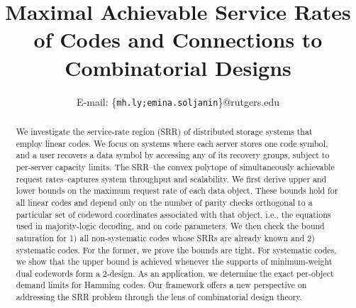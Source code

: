 \documentclass[conference,letterpaper]{IEEEtran}
\begin{document}
\title{Maximal Achievable Service Rates of Codes and Connections to Combinatorial Designs}


\author{%
                    E-mail: \{\texttt{mh.ly;emina.soljanin}\}@rutgers.edu
}
\maketitle
\begin{abstract}
We investigate the service-rate region (SRR) of distributed storage systems that employ linear codes. We focus on systems where each server stores one code symbol, and a user recovers a data symbol by accessing any of its recovery groups, subject to per-server capacity limits. The SRR--the convex polytope of simultaneously achievable request rates--captures system throughput and scalability. We first derive upper and lower bounds on the maximum request rate of each data object. These bounds hold for all linear codes and depend only on the number of parity checks orthogonal to a particular set of codeword coordinates associated with that object, i.e., the equations used in majority-logic decoding, and on code parameters. 
We then check the bound saturation for 1) all non-systematic codes whose SRRs are already known and 2) systematic codes. For the former, we prove the bounds are tight. For systematic codes, we show that the upper bound is achieved whenever the supports of minimum-weight dual codewords form a 2-design. As an application, we determine the exact per-object demand limits for Hamming codes. Our framework offers a new perspective on addressing the SRR problem through the lens of combinatorial design theory. 
\end{abstract}
\end{document}
